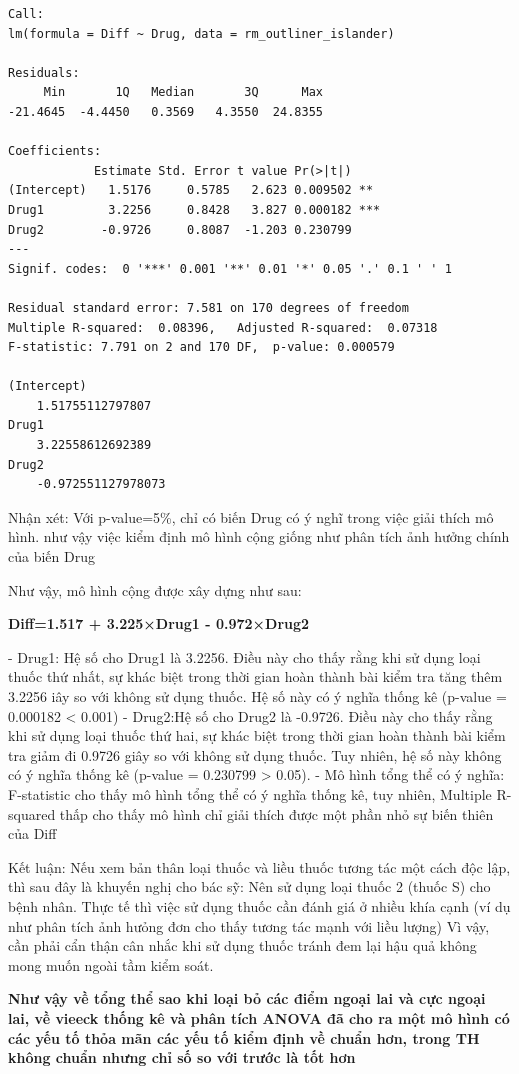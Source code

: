 \begin{itemize}
\begin{lstlisting}
Call:
lm(formula = Diff ~ Drug, data = rm_outliner_islander)

Residuals:
     Min       1Q   Median       3Q      Max 
-21.4645  -4.4450   0.3569   4.3550  24.8355 

Coefficients:
            Estimate Std. Error t value Pr(>|t|)    
(Intercept)   1.5176     0.5785   2.623 0.009502 ** 
Drug1         3.2256     0.8428   3.827 0.000182 ***
Drug2        -0.9726     0.8087  -1.203 0.230799    
---
Signif. codes:  0 '***' 0.001 '**' 0.01 '*' 0.05 '.' 0.1 ' ' 1

Residual standard error: 7.581 on 170 degrees of freedom
Multiple R-squared:  0.08396,	Adjusted R-squared:  0.07318 
F-statistic: 7.791 on 2 and 170 DF,  p-value: 0.000579

(Intercept)
    1.51755112797807
Drug1
    3.22558612692389
Drug2
    -0.972551127978073

    \end{lstlisting}
    Nhận xét: Với p-value=5\%, chỉ có biến Drug có ý nghĩ trong việc giải thích mô hình. như vậy việc kiểm định mô hình cộng giống như phân tích ảnh hưởng chính của biến Drug

Như vậy, mô hình cộng được xây dựng như sau:

\textbf{Diff=1.517 + 3.225×Drug1 - 0.972×Drug2}

- Drug1: Hệ số cho Drug1 là 3.2256. Điều này cho thấy rằng khi sử dụng loại thuốc thứ nhất, sự khác biệt trong thời gian hoàn thành bài kiểm tra tăng thêm
3.2256 iây so với không sử dụng thuốc. Hệ số này có ý nghĩa thống kê (p-value = 0.000182 < 0.001)
- Drug2:Hệ số cho Drug2 là -0.9726. Điều này cho thấy rằng khi sử dụng loại thuốc thứ hai, sự khác biệt trong thời gian hoàn thành bài kiểm tra giảm đi
0.9726 giây so với không sử dụng thuốc. Tuy nhiên, hệ số này không có ý nghĩa thống kê (p-value = 0.230799 > 0.05).
- Mô hình tổng thể có ý nghĩa: F-statistic cho thấy mô hình tổng thể có ý nghĩa thống kê, tuy nhiên, Multiple R-squared thấp cho thấy mô hình chỉ giải thích được một phần nhỏ sự biến thiên của Diff

Kết luận: Nếu xem bản thân loại thuốc và liều thuốc tương tác một cách độc lập, thì sau đây là khuyến nghị cho bác sỹ:
Nên sử dụng loại thuốc 2 (thuốc S) cho bệnh nhân.
Thực tế thì việc sử dụng thuốc cần đánh giá ở nhiều khía cạnh (ví dụ như phân tích ảnh hưỏng đơn cho thấy tương tác mạnh với liều lượng) Vì vậy, cần phải cẩn thận cân nhắc khi sử dụng thuốc tránh đem lại hậu quả không mong muốn ngoài tầm kiểm soát.

\textbf{Như vậy về tổng thể sao khi loại bỏ các điểm ngoại lai và cực ngoại lai, về vieeck thống kê và phân tích ANOVA đã cho ra một mô hình có các yếu tố thỏa mãn các yếu tố kiểm định về chuẩn hơn, trong TH không chuẩn nhưng chỉ số so với trước là tốt hơn}
\end{itemize}
